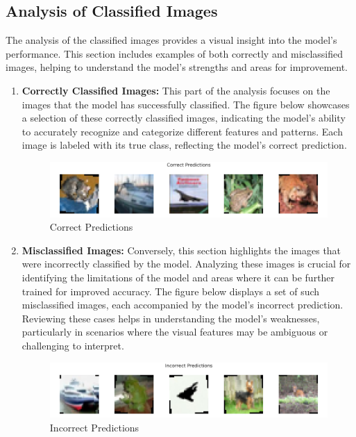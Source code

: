 \documentclass[conference]{IEEEtran}
\begin{document}
	
	\subsection{Analysis of Classified Images}
	The analysis of the classified images provides a visual insight into the model's performance. This section includes examples of both correctly and misclassified images, helping to understand the model's strengths and areas for improvement.
	
	\begin{enumerate}
		\item \textbf{Correctly Classified Images:}
		This part of the analysis focuses on the images that the model has successfully classified. The figure below showcases a selection of these correctly classified images, indicating the model's ability to accurately recognize and categorize different features and patterns. Each image is labeled with its true class, reflecting the model's correct prediction.
		
		\begin{figure}[htbp]
			\centerline{\includegraphics[width=\columnwidth]{images/correct_predictions.png}}
			\caption{Correct Predictions}
			\label{fig:correct_predictions}
		\end{figure}
		
		\item \textbf{Misclassified Images:}
		Conversely, this section highlights the images that were incorrectly classified by the model. Analyzing these images is crucial for identifying the limitations of the model and areas where it can be further trained for improved accuracy. The figure below displays a set of such misclassified images, each accompanied by the model's incorrect prediction. Reviewing these cases helps in understanding the model's weaknesses, particularly in scenarios where the visual features may be ambiguous or challenging to interpret.
		
		\begin{figure}[htbp]
			\centerline{\includegraphics[width=\columnwidth]{images/incorrect_predictions.png}}
			\caption{Incorrect Predictions}
			\label{fig:incorrect_predictions}
		\end{figure}
	\end{enumerate}
	
\end{document}
